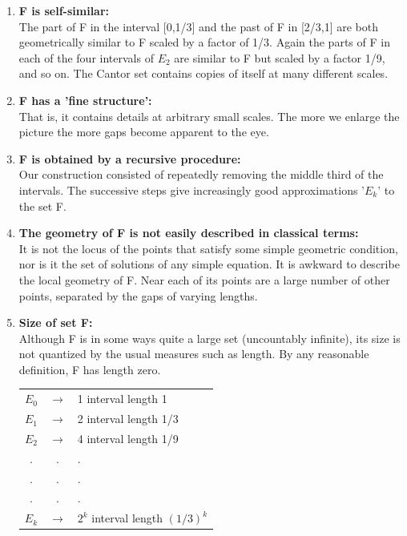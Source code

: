 \documentclass[14pt]{extarticle}
\begin{document}
\begin{enumerate}
\item  \textbf{F is self-similar:}\\
The part of F in the interval [0,1/3] and the past of F in [2/3,1] are both geometrically similar to F scaled by a factor of 1/3. Again the parts of F in each of the four intervals of $E_2$ are similar to F but scaled by a factor 1/9, and so on. The Cantor set contains copies of itself at many different scales.
\item \textbf{F has a 'fine structure':}\\
That is, it contains details at arbitrary small scales. The more we enlarge the picture the more gaps become apparent to the eye.

\item \textbf{F is obtained by a recursive procedure:}\\
Our construction consisted of repeatedly removing the middle third of the intervals. The successive steps give increasingly good approximations '$E_k$' to the set F.

\item \textbf{The geometry of F is not easily described in classical terms:}\\
It is not the locus of the points that satisfy some simple geometric condition, nor is it the set of solutions of any simple equation. It is awkward to describe the local geometry of F. Near each of its points are a large number of other points, separated by the gaps of varying lengths.

\item \textbf{Size of set F:}\\
Although F is in some ways quite a large set (uncountably infinite), its size is not quantized by the usual measures such as length. By any reasonable definition, F has length zero.
\begin{center}

\begin{tabular}{ccl}

$E_0$&$\rightarrow$ & 1 interval length 1   \\
$E_1$&$\rightarrow$ & 2 interval length 1/3 \\
$E_2$&$\rightarrow$ & 4 interval length 1/9 \\
.&. &.\\
.&. &.\\
.&. &.\\
$E_k$ &$\rightarrow$ & $2^k$ interval   length $(1/3)^k$\\



\end{tabular}
\end{center}
\end{enumerate}
\end{document}
